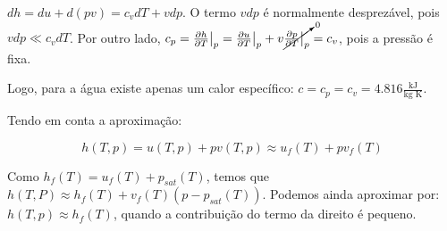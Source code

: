 $dh = du + d(pv) = c_v dT + v dp$. O termo $v dp$ é normalmente desprezável, pois $v dp \ll c_v dT$. Por outro lado, $c_p = \frac{\partial h}{\partial T} \bigr|_{p} = \frac{\partial u}{\partial T}\bigr|_{p} + v \cancelto{0}{\frac{\partial p}{\partial T}\bigr|_{p}} = c_v$, pois a pressão é fixa.

Logo, para a água existe apenas um calor específico: $c = c_p = c_v = 4.816 \frac{\text{kJ}}{\text{kg K}} $.

Tendo em conta a aproximação:

\begin{equation}
    h(T, p) = u(T,p) + p v(T,p) \approx u_f(T) + p v_f(T)
\end{equation}


Como $h_f(T) = u_f(T) + p_{sat}(T)$, temos que $h(T, P) \approx h_f(T) + v_f(T) (p - p_{sat}(T))$. Podemos ainda aproximar por: $h(T,p) \approx h_f(T)$, quando a contribuição do termo da direito é pequeno.

